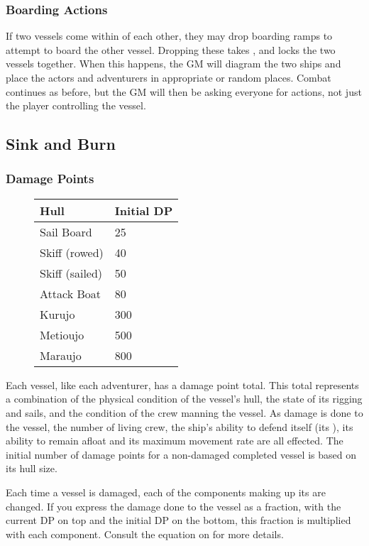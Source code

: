 \begin{multicols*}{2}
\subsubsection{Boarding Actions}
If two vessels come within  of each other, they may drop boarding ramps to attempt to board the other vessel. Dropping these takes , and locks the two vessels together. When this happens, the GM will diagram the two ships and place the actors and adventurers in appropriate or random places. Combat continues as before, but the GM will then be asking everyone for actions, not just the player controlling the vessel.
\subsection{Sink and Burn}
\subsubsection{Damage Points}
\begin{wrapfigure}[9]{l}[0pt]{130pt}
\begin{normbox}[Hull DP]
\small
\begin{tabular}{@{}ll}
\textbf{Hull} & \textbf{Initial DP}\\
\midrule
Sail Board & 25\\
Skiff (rowed) & 40\\
Skiff (sailed) & 50\\
Attack Boat & 80\\
Kurujo & 300\\
Metioujo & 500\\
Maraujo & 800\\
\end{tabular}
\end{normbox}
\end{wrapfigure}

Each vessel, like each adventurer, has a damage point total. This total represents a combination of the physical condition of the vessel's hull, the state of its rigging and sails, and the condition of the crew manning the vessel. As damage is done to the vessel, the number of living crew, the ship's ability to defend itself (its \ADV), its ability to remain afloat and its maximum movement rate are all effected. The initial number of damage points for a non-damaged completed vessel is based on its hull size.

Each time a vessel is damaged, each of the components making up its \DP are changed. If you express the damage done to the vessel as a fraction, with the current DP on top and the initial DP on the bottom, this fraction is multiplied with each component. Consult the equation on  for more details.


\end{multicols*}
